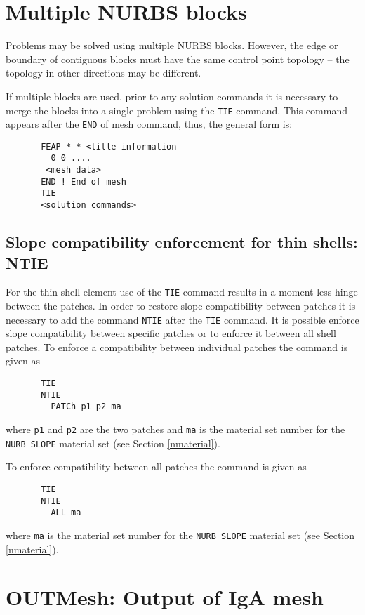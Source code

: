 \section{Multiple NURBS blocks}

Problems may be solved using multiple NURBS blocks.  However, the edge or
boundary of contiguous blocks must have the same control point topology --
the topology in other directions may be different.

If multiple blocks are used, prior to any solution commands  it is
necessary to merge the blocks into a single
problem using the \texttt{TIE} command.
This command appears after the \texttt{END} of mesh command, thus,
the general form is:
\begin{verbatim}
       FEAP * * <title information
         0 0 ....
        <mesh data>
       END ! End of mesh
       TIE
       <solution commands>
\end{verbatim}

\subsection{Slope compatibility enforcement for thin shells: NTIE}
\label{ntie}

For the thin shell element use of the \texttt{TIE} command results in
a moment-less hinge between the patches.  In order to restore slope
compatibility between patches it is necessary to add the command
\texttt{NTIE} after the \texttt{TIE} command.
It is possible enforce slope compatibility between specific patches or
to enforce it between all shell patches.
To enforce a compatibility between individual patches the command is
given as
\begin{verbatim}
       TIE
       NTIE
         PATCh p1 p2 ma
\end{verbatim}
where \texttt{p1} and \texttt{p2} are the two patches and
\texttt{ma} is the material set number for the
\texttt{NURB\_SLOPE} material set (see Section \ref{nmaterial}).

To enforce compatibility between all patches the command 
is given as
\begin{verbatim}
       TIE
       NTIE
         ALL ma
\end{verbatim}
where \texttt{ma} is the material set number for the
\texttt{NURB\_SLOPE} material set (see Section \ref{nmaterial}).

\section{OUTMesh: Output of IgA mesh}

